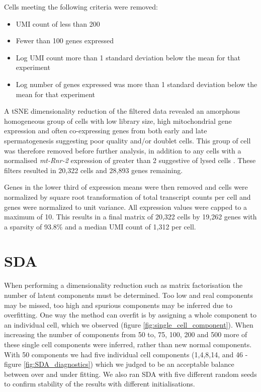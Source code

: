 Cells meeting the following criteria were removed:
\begin{itemize}
\item UMI count of less than 200
\item Fewer than 100 genes expressed
\item Log UMI count more than 1 standard deviation below the mean for that experiment
\item Log number of genes expressed was more than 1 standard deviation below the mean for that experiment
\end{itemize}

A tSNE dimensionality reduction of the filtered data revealed an amorphous homogeneous group of cells with low library size, high mitochondrial gene expression and often co-expressing genes from both early and late spermatogenesis suggesting poor quality and/or doublet cells. This group of cell was therefore removed before further analysis, in addition to any cells with a normalised \textit{mt-Rnr-2} expression of greater than 2 suggestive of lysed cells \parencite{Ilicic2016Classification}. These filters resulted in 20,322 cells and 28,893 genes remaining.

Genes in the lower third of expression means were then removed and cells were normalized by square root transformation of total transcript counts per cell and genes were normalized to unit variance. All expression values were capped to a maximum of 10. This results in a final matrix of 20,322 cells by 19,262 genes with a sparsity of 93.8\% and a median UMI count of 1,312 per cell.


\section{SDA}

When performing a dimensionality reduction such as matrix factorisation the number of latent components must be determined. Too low and real components may be missed, too high and spurious components may be inferred due to overfitting. One way the method can overfit is by assigning a whole component to an individual cell, which we observed (figure \ref{fig:single_cell_component}). When increasing the number of components from 50 to, 75, 100, 200 and 500 more of these single cell components were inferred, rather than new normal components. With 50 components we had five individual cell components (1,4,8,14, and 46 - figure \ref{fig:SDA_diagnostics}) which we judged to be an acceptable balance between over and under fitting. We also ran SDA with five different random seeds to confirm stability of the results with different initialisations.


